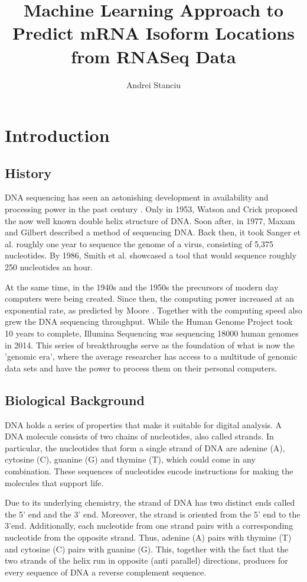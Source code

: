 \documentclass[12pt]{article}
\title{%
    Machine Learning Approach to Predict mRNA Isoform Locations from RNASeq Data }
\author{Andrei Stanciu}
\begin{document}
\maketitle

\section{Introduction}


\subsection{History}
DNA  sequencing has seen an astonishing development in availability and processing power in the past century
\cite{Hood2003}. Only in 1953, Watson and Crick \cite{WATSON1953} proposed the now well known double helix structure of DNA. Soon after, in 1977, Maxam and Gilbert \cite{Maxam1977} described a method of sequencing DNA. Back then, it took Sanger et al. \cite{Sanger1977} roughly one year to sequence the genome of a virus, consisting of 5,375 nucleotides. By 1986, Smith et al. \cite{Smith1986} showcased a tool that would sequence roughly 250 nucleotides an hour. 

At the same time, in the 1940s and the 1950s the precursors of modern day computers were being created. Since then, the computing power increased at an exponential rate, as predicted by Moore \cite{Moore2006}. Together with the computing speed also grew the DNA sequencing throughput. While the Human Genome Project took 10 years to complete, Illumina Sequencing \cite{illuminaSeq} was sequencing 18000 human genomes in 2014. This series of breakthroughs serve as the foundation of what is now the 'genomic era', where the average researcher has access to a multitude of genomic data sets and have the power to process them on their personal computers.   

\subsection{Biological Background}
DNA holds a series of properties that make it suitable for digital analysis. A DNA molecule consists of two chains of nucleotides, also called strands. In particular, the nucleotides that form a single strand of DNA are adenine (A), cytosine (C), guanine (G) and thymine (T), which could come in any combination. These sequences of nucleotides  encode instructions for making the molecules that support life. 


Due to its underlying chemistry, the strand of DNA has two distinct ends called the 5' end and the 3' end. Moreover, the strand is oriented from the 5' end to the 3'end. Additionally, each nucleotide from one strand pairs with a corresponding nucleotide from the opposite strand. Thus, adenine (A) pairs with thymine (T) and cytosine (C) pairs with guanine (G). This, together with the fact that the two strands of the helix run in opposite (anti parallel) directions, produces for every sequence of DNA a reverse complement sequence. 
\end{document}
